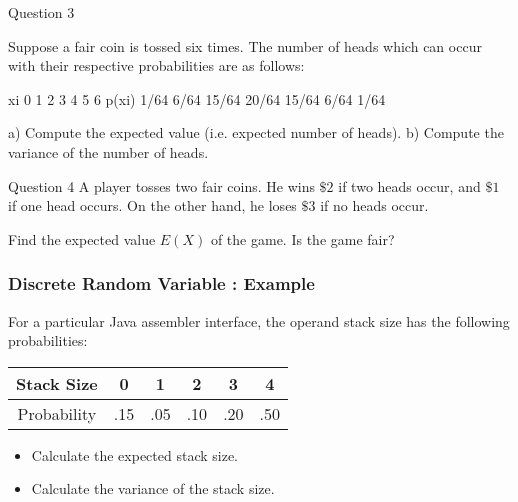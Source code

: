 \documentclass[IntroMain.tex]{subfiles}
\begin{document}
\begin{frame}
	
	Question 3
	
	Suppose a fair coin is tossed six times. The number of heads which can occur with their respective
	probabilities are as follows:
	
	xi	0	1	2	3	4	5	6
	p(xi)	1/64	6/64	15/64	20/64	15/64	6/64	1/64
	
	a)	Compute the expected value (i.e. expected number of heads).
	b)	Compute the variance of the number of heads.
	
\end{frame}
\begin{frame}
	
	Question 4
	A player tosses two fair coins. He wins $\$2$ if two heads occur, and $\$1$ if one head occurs. On the other hand, he loses $\$3$ if no heads occur. 
	
	Find the expected value $E(X)$ of the game. Is the game fair? 
	
	
\end{frame}
\begin{frame}
\frametitle{Discrete Random Variable : Example}
\Large
\vspace{-0.5cm}
For a particular Java assembler interface, the operand stack size has the
following probabilities:
\begin{center}
\begin{tabular}{|c||c|c|c|c|c|}
	\hline
	Stack Size  & 0 & 1 & 2 & 3 & 4 \\ \hline
	Probability & .15 & .05 & .10 &.20 &.50\\
	\hline
\end{tabular}
\end{center}


\begin{itemize}

\item Calculate the expected stack size.
\item Calculate the variance of the stack size.

\end{itemize}
\end{frame}
\end{document}
